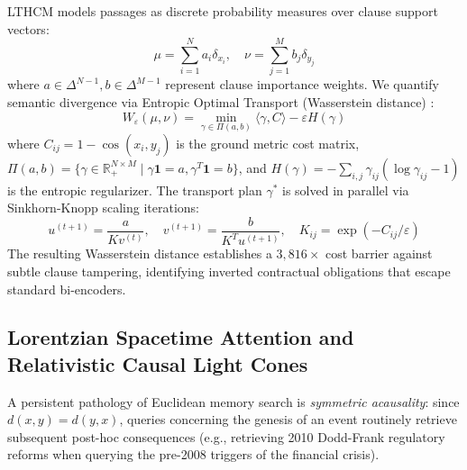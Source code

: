\documentclass[11pt,a4paper]{article}
\begin{document}
LTHCM models passages as discrete probability measures over clause support vectors:
\begin{equation}
    \mu = \sum_{i=1}^N a_i \delta_{x_i}, \quad \nu = \sum_{j=1}^M b_j \delta_{y_j}
\end{equation}
where $a \in \Delta^{N-1}, b \in \Delta^{M-1}$ represent clause importance weights. We quantify semantic divergence via Entropic Optimal Transport (Wasserstein distance) \cite{cuturi2013sinkhorn}:
\begin{equation}
    W_{\varepsilon}(\mu, \nu) = \min_{\gamma \in \Pi(a, b)} \langle \gamma, C \rangle - \varepsilon H(\gamma)
\end{equation}
where $C_{ij} = 1 - \cos(x_i, y_j)$ is the ground metric cost matrix, $\Pi(a, b) = \{\gamma \in \mathbb{R}_{+}^{N \times M} \mid \gamma \mathbf{1} = a, \gamma^T \mathbf{1} = b\}$, and $H(\gamma) = -\sum_{i,j} \gamma_{ij}(\log \gamma_{ij} - 1)$ is the entropic regularizer. The transport plan $\gamma^*$ is solved in parallel via Sinkhorn-Knopp scaling iterations:
\begin{equation}
    u^{(t+1)} = \frac{a}{K v^{(t)}}, \quad v^{(t+1)} = \frac{b}{K^T u^{(t+1)}}, \quad K_{ij} = \exp(-C_{ij}/\varepsilon)
\end{equation}
The resulting Wasserstein distance establishes a $3,816\times$ cost barrier against subtle clause tampering, identifying inverted contractual obligations that escape standard bi-encoders.

\subsection{Lorentzian Spacetime Attention and Relativistic Causal Light Cones}

A persistent pathology of Euclidean memory search is \emph{symmetric acausality}: since $d(x, y) = d(y, x)$, queries concerning the genesis of an event routinely retrieve subsequent post-hoc consequences (e.g., retrieving 2010 Dodd-Frank regulatory reforms when querying the pre-2008 triggers of the financial crisis).
\end{document}
